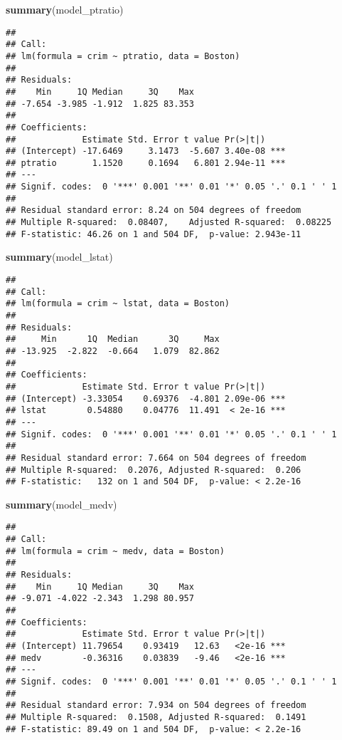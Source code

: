 \documentclass[
]{article}
\newenvironment{Shaded}{\begin{snugshade}}{\end{snugshade}}
\newcommand{\FunctionTok}[1]{\textcolor[rgb]{0.13,0.29,0.53}{\textbf{#1}}}
\newcommand{\NormalTok}[1]{#1}
\begin{document}
\begin{Shaded}
\begin{Highlighting}[]
\FunctionTok{summary}\NormalTok{(model\_ptratio)}
\end{Highlighting}
\end{Shaded}

\begin{verbatim}
## 
## Call:
## lm(formula = crim ~ ptratio, data = Boston)
## 
## Residuals:
##    Min     1Q Median     3Q    Max 
## -7.654 -3.985 -1.912  1.825 83.353 
## 
## Coefficients:
##             Estimate Std. Error t value Pr(>|t|)    
## (Intercept) -17.6469     3.1473  -5.607 3.40e-08 ***
## ptratio       1.1520     0.1694   6.801 2.94e-11 ***
## ---
## Signif. codes:  0 '***' 0.001 '**' 0.01 '*' 0.05 '.' 0.1 ' ' 1
## 
## Residual standard error: 8.24 on 504 degrees of freedom
## Multiple R-squared:  0.08407,    Adjusted R-squared:  0.08225 
## F-statistic: 46.26 on 1 and 504 DF,  p-value: 2.943e-11
\end{verbatim}

\begin{Shaded}
\begin{Highlighting}[]
\FunctionTok{summary}\NormalTok{(model\_lstat)}
\end{Highlighting}
\end{Shaded}

\begin{verbatim}
## 
## Call:
## lm(formula = crim ~ lstat, data = Boston)
## 
## Residuals:
##     Min      1Q  Median      3Q     Max 
## -13.925  -2.822  -0.664   1.079  82.862 
## 
## Coefficients:
##             Estimate Std. Error t value Pr(>|t|)    
## (Intercept) -3.33054    0.69376  -4.801 2.09e-06 ***
## lstat        0.54880    0.04776  11.491  < 2e-16 ***
## ---
## Signif. codes:  0 '***' 0.001 '**' 0.01 '*' 0.05 '.' 0.1 ' ' 1
## 
## Residual standard error: 7.664 on 504 degrees of freedom
## Multiple R-squared:  0.2076, Adjusted R-squared:  0.206 
## F-statistic:   132 on 1 and 504 DF,  p-value: < 2.2e-16
\end{verbatim}

\begin{Shaded}
\begin{Highlighting}[]
\FunctionTok{summary}\NormalTok{(model\_medv)}
\end{Highlighting}
\end{Shaded}

\begin{verbatim}
## 
## Call:
## lm(formula = crim ~ medv, data = Boston)
## 
## Residuals:
##    Min     1Q Median     3Q    Max 
## -9.071 -4.022 -2.343  1.298 80.957 
## 
## Coefficients:
##             Estimate Std. Error t value Pr(>|t|)    
## (Intercept) 11.79654    0.93419   12.63   <2e-16 ***
## medv        -0.36316    0.03839   -9.46   <2e-16 ***
## ---
## Signif. codes:  0 '***' 0.001 '**' 0.01 '*' 0.05 '.' 0.1 ' ' 1
## 
## Residual standard error: 7.934 on 504 degrees of freedom
## Multiple R-squared:  0.1508, Adjusted R-squared:  0.1491 
## F-statistic: 89.49 on 1 and 504 DF,  p-value: < 2.2e-16
\end{verbatim}
\end{document}
